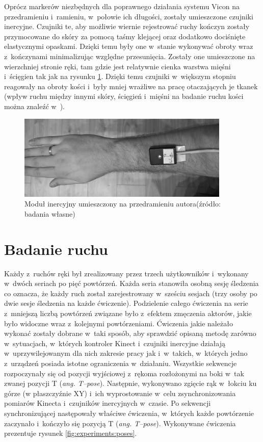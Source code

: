 Oprócz markerów niezbędnych dla poprawnego działania systemu Vicon na przedramieniu i~ramieniu, w~połowie ich długości, zostały umieszczone czujniki inercyjne. Czujniki te, aby możliwie wiernie rejestrować ruchy kończyn zostały przymocowane do skóry za pomocą taśmy klejącej oraz dodatkowo dociśnięte elastycznymi opaskami. Dzięki temu były one w~stanie wykonywać obroty wraz z~kończynami minimalizując względne przesunięcia. Zostały one umieszczone na wierzchniej stronie ręki, tam gdzie jest relatywnie cienka warstwa mięśni i~ścięgien tak jak na rysunku \ref{fig:experiments:handMarker}. Dzięki temu czujniki w~większym stopniu reagowały na obroty kości i~były mniej wrażliwe na pracę otaczających je tkanek (wpływ ruchu między innymi skóry, ścięgień i~mięśni na badanie ruchu kości można znaleźć w~\cite{Sati2016,Reinschmidt2016}).
				
\begin{figure}[!htb]
	\centering
	\includegraphics[width=0.9\textwidth]{images/WP_20170423_00_49_25_Raw.jpg}
	\caption{Moduł inercyjny umieszczony na przedramieniu autora(źródło: badania własne)}
	\label{fig:experiments:handMarker}
\end{figure}
				
\section{Badanie ruchu}
				
Każdy z~ruchów ręki był zrealizowany przez trzech użytkowników i~wykonany w~dwóch seriach po pięć powtórzeń. Każda seria stanowiła osobną sesję śledzenia co oznacza, że każdy ruch został zarejestrowany w~sześciu sesjach (trzy osoby po dwie sesje śledzenia na każde ćwiczenie). Podzielenie całego ćwiczenia na serie z~mniejszą liczbą powtórzeń związane było z~efektem zmęczenia aktorów, jakie było widoczne wraz z~kolejnymi powtórzeniami. Ćwiczenia jakie należało wykonać zostały dobrane w~taki sposób, aby sprawdzić opisaną metodę zarówno w~sytuacjach, w~których kontroler Kinect i~czujniki inercyjne działają w~uprzywilejowanym dla nich zakresie pracy jak i~w~takich, w~których jedno z~urządzeń posiada istotne ograniczenia w~działaniu. Wszystkie sekwencje rozpoczynały się od pozycji wyjściowej z~rękoma rozłożonymi na boki w~tak zwanej pozycji T (\emph{ang. T--pose}). Następnie, wykonywano zgięcie rąk w~łokciu ku górze (w płaszczyźnie XY) i~ich wyprostowanie w~celu zsynchronizowania pomiarów Kinecta i~czujników inercyjnych w~czasie. Po sekwencji synchronizującej następowały właściwe ćwiczenia, w~których każde powtórzenie zaczynało i~kończyło się pozycją T (\emph{ang. T--pose}). Wykonywane ćwiczenia prezentuje rysunek \ref{fig:experiments:poses}.
			

